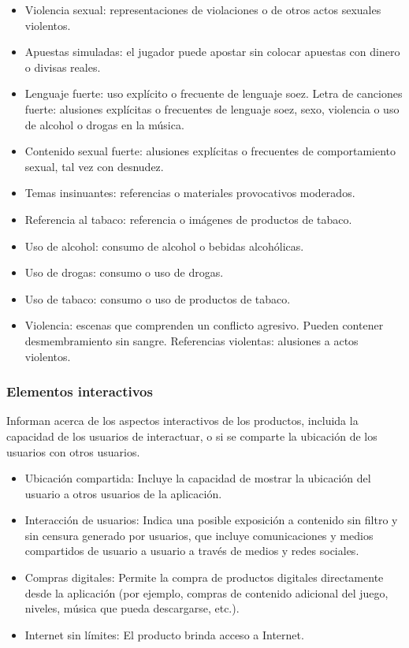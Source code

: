 \begin{itemize}
				\item Violencia sexual: representaciones de violaciones o de otros actos sexuales violentos.
				\item Apuestas simuladas: el jugador puede apostar sin colocar apuestas con dinero o divisas reales.
				\item Lenguaje fuerte: uso explícito o frecuente de lenguaje soez.
				Letra de canciones fuerte: alusiones explícitas o frecuentes de lenguaje soez, sexo, violencia o uso de alcohol o drogas en la música.
				\item Contenido sexual fuerte: alusiones explícitas o frecuentes de comportamiento sexual, tal vez con desnudez.
				\item Temas insinuantes: referencias o materiales provocativos moderados.
				\item Referencia al tabaco: referencia o imágenes de productos de tabaco.
				\item Uso de alcohol: consumo de alcohol o bebidas alcohólicas.
				\item Uso de drogas: consumo o uso de drogas.
				\item Uso de tabaco: consumo o uso de productos de tabaco.
				\item Violencia: escenas que comprenden un conflicto agresivo. Pueden contener desmembramiento sin sangre.
				Referencias violentas: alusiones a actos violentos.
			\end{itemize}
			
			\subsubsection{Elementos interactivos} 
			Informan acerca de los aspectos interactivos de los productos, incluida la capacidad de los usuarios de interactuar, o si se comparte la ubicación de los usuarios con otros usuarios.
			
			\begin{itemize}
			
			\item Ubicación compartida: Incluye la capacidad de mostrar la ubicación del usuario a otros usuarios de la aplicación.
			\item Interacción de usuarios: Indica una posible exposición a contenido sin filtro y sin censura generado por usuarios, que incluye comunicaciones y medios compartidos de usuario a usuario a través de medios y redes sociales.
			\item Compras digitales: Permite la compra de productos digitales directamente desde la aplicación (por ejemplo, compras de contenido adicional del juego, niveles, música que pueda descargarse, etc.).
			\item Internet sin límites: El producto brinda acceso a Internet.
		\end{itemize}
		
